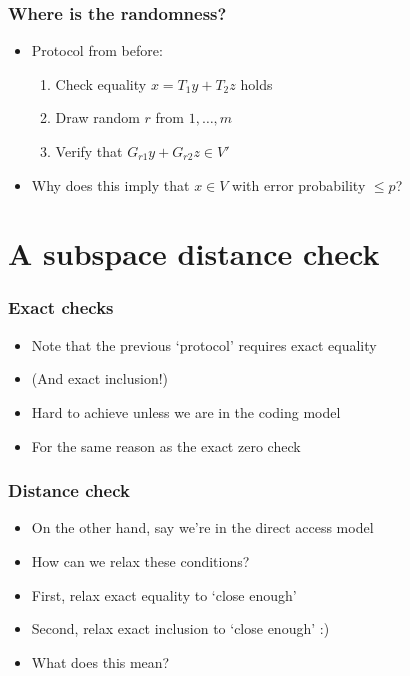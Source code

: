 \documentclass{beamer}
\begin{document}
    \begin{frame}
        \frametitle{Where is the randomness?}
        \begin{itemize}\itemsep=12pt
            \item Protocol from before:
            \begin{enumerate}\itemsep=8pt
                \item Check equality $x = T_1y+T_2z$ holds
                \item Draw random $r$ from $1, \dots, m$
                \item Verify that $G_{r1}y + G_{r2}z \in V'$
            \end{enumerate}
            \item Why does this imply that $x \in V$ with error probability $\le p$?
        \end{itemize}
	\end{frame}

    \section{A subspace distance check}
    \begin{frame}
        \frametitle{Exact checks}
        \begin{itemize}\itemsep=12pt
            \item Note that the previous `protocol' requires exact equality
            \item (And exact inclusion!)
            \pause
            \item Hard to achieve unless we are in the coding model
            \item For the same reason as the exact zero check
        \end{itemize}
	\end{frame}

    \begin{frame}
        \frametitle{Distance check}
        \begin{itemize}\itemsep=12pt
            \item On the other hand, say we're in the direct access model
            \item How can we relax these conditions?
            \pause
            \item First, relax exact equality to `close enough'
            \pause
            \item Second, relax exact inclusion to `close enough' :)
            \pause
            \item What does this mean?
        \end{itemize}
	\end{frame}
\end{document}
